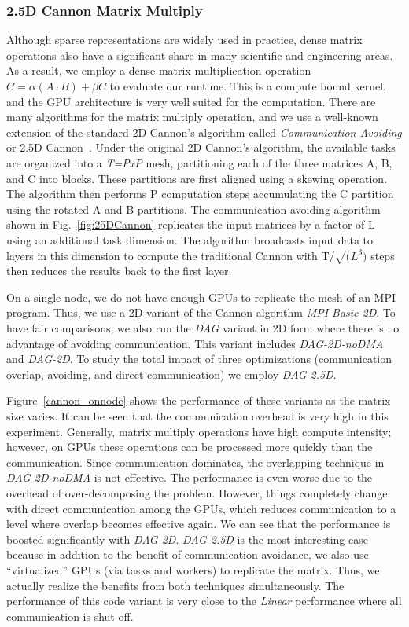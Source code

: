 \subsubsection{2.5D Cannon Matrix Multiply}
Although sparse representations are widely used in practice, dense matrix operations also have a significant share in many scientific and engineering areas.
As a result, we employ a dense matrix multiplication operation $C = \alpha (A \cdot B) + \beta C$ to evaluate our runtime.
This is a compute bound kernel, and the GPU architecture is very well suited for the computation. 
There are many algorithms for the matrix multiply operation, and we use a well-known extension of the standard 2D Cannon's algorithm called {\em Communication Avoiding} or 2.5D Cannon~\cite{25Dcannon}. 
Under the original 2D Cannon's algorithm, the available tasks are organized into a {\em T=PxP} mesh, partitioning each of the three matrices A, B, and C into blocks.
These partitions are first aligned using a skewing operation.
The algorithm then performs P computation steps accumulating the C partition using the rotated A and B partitions.
The communication avoiding algorithm shown in Fig.~\ref{fig:25DCannon} replicates the input matrices by a factor of L using an additional task dimension.
The algorithm broadcasts input data to layers in this dimension to compute the traditional Cannon with T/$\sqrt(L^3)$ steps then reduces the results back to the first layer.

On a single node, we do not have enough GPUs to replicate the mesh of an MPI program.
Thus, we use a 2D variant of the Cannon algorithm {\em MPI-Basic-2D}.
To have fair comparisons, we also run the {\em DAG} variant in 2D form where there is no advantage of avoiding communication.
This variant includes {\em DAG-2D-noDMA} and {\em DAG-2D}.
To study the total impact of three optimizations (communication overlap, avoiding, and direct communication) we employ {\em DAG-2.5D}.

Figure~\ref{cannon_onnode} shows the performance of these variants as the matrix size varies.
It can be seen that the communication overhead is very high in this experiment.
Generally, matrix multiply operations have high compute intensity;
however, on GPUs these operations can be processed more quickly than the communication.
Since communication dominates, the overlapping technique in {\em DAG-2D-noDMA} is not effective.
The performance is even worse due to the overhead of over-decomposing the problem.
However, things completely change with direct communication among the GPUs, which
reduces communication to a level where overlap becomes effective again.
We can see that the performance is boosted significantly with {\em DAG-2D}.
{\em DAG-2.5D} is the most interesting case because in addition to the benefit of communication-avoidance,
we also use ``virtualized'' GPUs (via tasks and workers) to replicate the matrix.
Thus, we actually realize the benefits from both techniques simultaneously.
The performance of this code variant is very close to the {\em Linear} performance where all communication is shut off.


